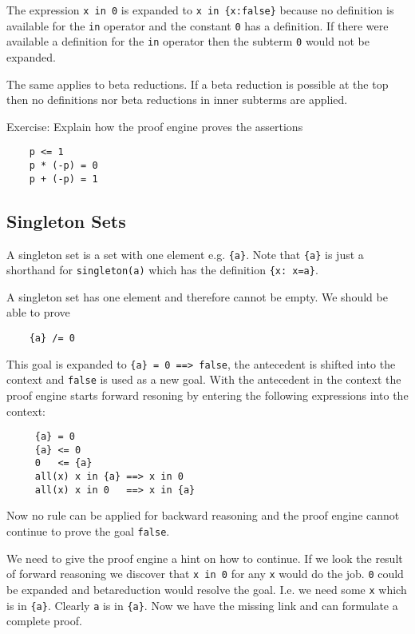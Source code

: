 The expression \lstinline!x in 0! is expanded to \lstinline!x in {x:false}!
because no definition is available for the \lstinline!in! operator and the
constant \lstinline!0! has a definition. If there were available a definition
for the \lstinline!in! operator then the subterm \lstinline!0! would not be
expanded.

The same applies to beta reductions. If a beta reduction is possible at the
top then no definitions nor beta reductions in inner subterms are applied.

Exercise: Explain how the proof engine proves the assertions
\begin{lstlisting}
    p <= 1
    p * (-p) = 0
    p + (-p) = 1
\end{lstlisting}


\subsection{Singleton Sets}

A singleton set is a set with one element e.g. \lstinline!{a}!. Note that
\lstinline!{a}! is just a shorthand for \lstinline!singleton(a)! which has the
definition \lstinline!{x: x=a}!.

A singleton set has one element and therefore cannot be empty. We should be
able to prove
\begin{lstlisting}
    {a} /= 0
\end{lstlisting}
This goal is expanded to \lstinline!{a} = 0 ==> false!, the antecedent is
shifted into the context and \lstinline!false! is used as a new goal. With the
antecedent in the context the proof engine starts forward resoning by entering
the following expressions into the context:
\begin{lstlisting}
     {a} = 0
     {a} <= 0
     0   <= {a}
     all(x) x in {a} ==> x in 0
     all(x) x in 0   ==> x in {a}
\end{lstlisting}
Now no rule can be applied for backward reasoning and the proof engine cannot
continue to prove the goal \lstinline!false!.

We need to give the proof engine a hint on how to continue. If we look the
result of forward reasoning we discover that \lstinline!x in 0! for any
\lstinline!x! would do the job. \lstinline!0! could be expanded and
betareduction would resolve the goal. I.e. we need some \lstinline!x! which is
in \lstinline!{a}!. Clearly \lstinline!a! is in \lstinline!{a}!. Now we have
the missing link and can formulate a complete proof.

